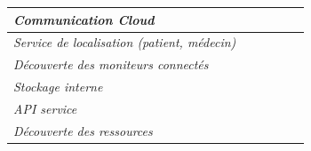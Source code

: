 \begin{table}[h!]
\begin{tabular}{|l|c|c|c|c|c|}
		\textit{Communication Cloud}                         &                                                                                  &                                                                               & \checkmark                                                                 &                                                                               &                                                                        \\ \hline
		\textit{Service de localisation (patient, médecin)}  &                                                                                  & \checkmark                                                                    &                                                                            &                                                                               &                                                                        \\ \hline
		\textit{Découverte des moniteurs connectés}          & \checkmark                                                                       &                                                                               &                                                                            &                                                                               &                                                                        \\ \hline
		\textit{Stockage interne}                            &                                                                                  &                                                                               & \checkmark                                                                 &                                                                               &                                                                        \\ \hline
		\textit{API service}                                 &                                                                                  &                                                                               &                                                                            &                                                                               &                                                                        \\ \hline
		\hline                                                                              
		\textit{Découverte des ressources}                   & \checkmark                                                                       &                                                                               &                                                                            &                                                                               &                                                                        \\ \hline

\end{tabular}
\end{table}
